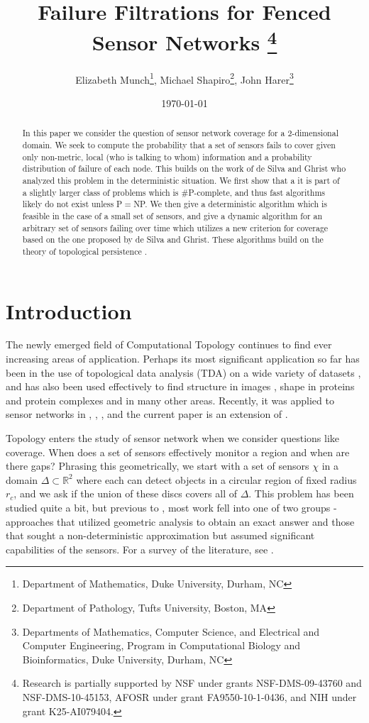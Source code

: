 \documentclass[10pt,twocolumn]{article} \usepackage{amsmath,epsf,amssymb,cite,pifont,amsthm, mathrsfs,epsfig,  bbm, amsthm,  setspace}
\title{Failure Filtrations for Fenced Sensor Networks
\footnote{Research is partially supported by NSF under grants 
NSF-DMS-09-43760 and
NSF-DMS-10-45153, 
AFOSR  under grant  FA9550-10-1-0436, 
and
NIH under grant K25-AI079404.
}}
\author{Elizabeth Munch\footnote{Department of Mathematics, Duke University, Durham, NC},  Michael Shapiro\footnote{Department of Pathology, Tufts University, Boston, MA}, John Harer\footnote{Departments of Mathematics, Computer Science, and Electrical and Computer Engineering, Program in Computational Biology and Bioinformatics, Duke University, Durham, NC}}
\date{\today}
\renewcommand{\1}{\mathbbm{1}}
\begin{document}
\maketitle

\begin{abstract}

In this paper we consider the question of sensor network coverage for  a 2-dimensional domain.
We seek to compute the probability  that a set of sensors fails to cover given only
non-metric, local (who is talking to whom) information
and a probability distribution of failure of each node.
This builds on the work of de Silva and Ghrist who analyzed this
problem in the deterministic situation.
We first show that a it is part of a slightly larger class of problems which is \#P-complete, and thus fast algorithms likely do not exist unless P$=$NP.
We then give a deterministic algorithm which is feasible in the case of a small set of sensors,
and give a dynamic algorithm for an arbitrary set of sensors failing over time which utilizes a new criterion for coverage based on the one proposed by de Silva and Ghrist.
These algorithms build on the theory of topological persistence
\cite{Edelsbrunner2010}.

\end{abstract}



\section{Introduction}


The newly emerged field of Computational Topology \cite{Edelsbrunner2010} continues to find ever
increasing areas of application.
Perhaps its most significant application so far has been in the use of topological data analysis (TDA) on a wide variety
of datasets   \cite{Edelsbrunner2010} \cite{Carlsson2009} \cite{Chazal2009},
and has also been used effectively to find
structure in images \cite{Carlsson2008}\cite{Edelsbrunner2009},
shape in proteins and protein complexes \cite{Agarwal2006}\cite{Ban2004}\cite{Headd2007}
and in many other areas.
Recently, it was applied to sensor networks in \cite{Ghrist2005}, \cite{DeSilva2006}, \cite{DeSilva2007},\cite{Tahbaz-Salehi2010}
and the current paper is an extension of \cite{DeSilva2006}. 

Topology enters the study of sensor network when we consider questions like coverage.
When does a set of sensors effectively monitor a region and when are there gaps?
Phrasing this geometrically,
we start with a set of sensors $\chi$ in a domain $\Delta \subset \mathbb{R}^2$
where each can detect objects in a circular region of fixed radius $r_c$,
and we ask if the union of these discs covers all of $\Delta$.
This problem has been studied quite a bit,
but previous to \cite{DeSilva2006}, most work fell into one of two groups -
approaches that utilized geometric analysis to obtain an exact answer
and those that sought a non-deterministic approximation but assumed
significant capabilities of the sensors.
For a survey of the literature, see \cite{Yick2008}.
\end{document}
